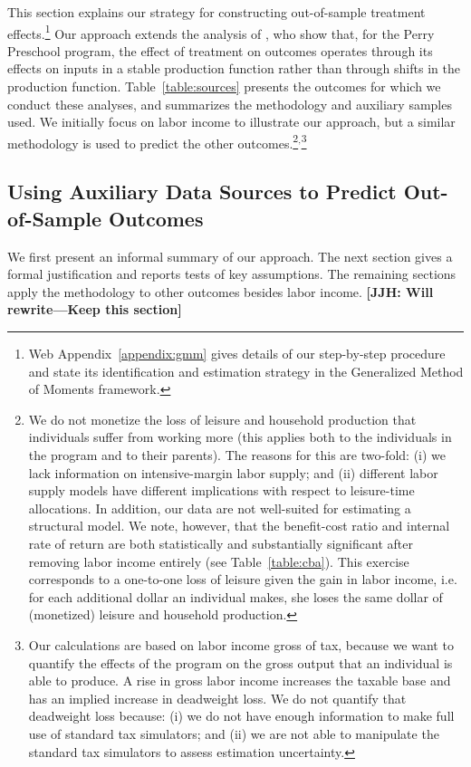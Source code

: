 This section explains our strategy for constructing out-of-sample treatment effects.\footnote{Web Appendix~\ref{appendix:gmm} gives details of our step-by-step procedure and state its identification and estimation strategy in the Generalized Method of Moments framework.} Our approach extends the analysis of \citet{Heckman_Pinto_etal_2013_PerryFactor}, who show that, for the Perry Preschool program, the effect of treatment on outcomes operates through its effects on inputs in a stable production function rather than through shifts in the production function. Table~\ref{table:sources} presents the outcomes for which we conduct these analyses, and summarizes the methodology and auxiliary samples used. We initially focus on labor income to illustrate our approach, but a similar methodology is used to predict the other outcomes.\footnote{We do not monetize the loss of leisure and household production that individuals suffer from working more (this applies both to the individuals in the program and to their parents). The reasons for this are two-fold: (i) we lack information on intensive-margin labor supply; and (ii) different labor supply models have different implications with respect to leisure-time allocations. In addition, our data are not well-suited for estimating a structural model. We note, however, that the benefit-cost ratio and internal rate of return are both statistically and substantially significant after removing labor income entirely (see Table~\ref{table:cba}). This exercise corresponds to a one-to-one loss of leisure given the gain in labor income, i.e. for each additional dollar an individual makes, she loses the same dollar of (monetized) leisure and household production.}$^,$\footnote{Our calculations are based on labor income gross of tax, because we want to quantify the effects of the program on the gross output that an individual is able to produce. A rise in gross labor income increases the taxable base and has an implied increase in deadweight loss. We do not quantify that deadweight loss because: (i) we do not have enough information to make full use of standard tax simulators; and (ii) we are not able to manipulate the standard tax simulators to assess estimation uncertainty.}

\subsection{Using Auxiliary Data Sources to Predict Out-of-Sample Outcomes}\label{sec:usingaux}

We first present an informal summary of our approach. The next section gives a formal justification and reports tests of key assumptions. The remaining sections apply the methodology to other outcomes besides labor income.  \textbf{[JJH: Will rewrite---Keep this section]}


